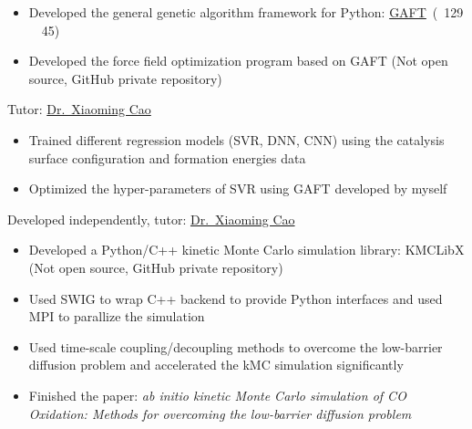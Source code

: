 \documentclass{resume}
\begin{document}
\begin{onehalfspacing}
\begin{itemize}
    \item Developed the general genetic algorithm framework for Python: \faLink \href{https://github.com/PytLab/gaft}{GAFT}\ (\faStar\ 129 \ \faCodeFork\ 45)
  \item Developed the force field optimization program based on GAFT (Not open source, GitHub private repository)
\end{itemize}
\end{onehalfspacing}

 {Tutor: \faLink \href{http://chem.ecust.edu.cn/2014/1211/c6655a50467/page.htm}{Dr.\ Xiaoming Cao}}
\begin{onehalfspacing}
\begin{itemize}
    \item Trained different regression models (SVR, DNN, CNN) using the catalysis surface configuration and formation energies data
    \item Optimized the hyper-parameters of SVR using GAFT developed by myself
\end{itemize}
\end{onehalfspacing}

 {Developed independently, tutor: \faLink \href{http://chem.ecust.edu.cn/2014/1211/c6655a50467/page.htm}{Dr.\ Xiaoming Cao}}
\begin{onehalfspacing}
\begin{itemize}
    \item Developed a Python/C++ kinetic Monte Carlo simulation library: KMCLibX (Not open source, GitHub private repository)
    \item Used SWIG to wrap C++ backend to provide Python interfaces and used MPI to parallize the simulation
    \item Used time-scale coupling/decoupling methods to overcome the low-barrier diffusion problem and accelerated the kMC simulation significantly
    \item Finished the paper: \emph{ab initio kinetic Monte Carlo simulation of CO Oxidation: Methods for overcoming the low-barrier diffusion problem}
\end{itemize}
\end{onehalfspacing}
\end{document}
